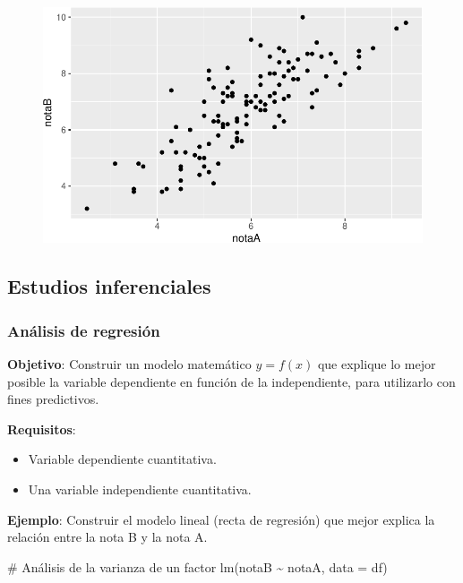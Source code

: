 \documentclass[
  a4paper,
]{scrreport}
\newenvironment{Shaded}{\begin{snugshade}}{\end{snugshade}}
\newcommand{\AttributeTok}[1]{\textcolor[rgb]{0.40,0.45,0.13}{#1}}
\newcommand{\CommentTok}[1]{\textcolor[rgb]{0.37,0.37,0.37}{#1}}
\newcommand{\FunctionTok}[1]{\textcolor[rgb]{0.28,0.35,0.67}{#1}}
\newcommand{\NormalTok}[1]{\textcolor[rgb]{0.00,0.23,0.31}{#1}}
\newcommand{\SpecialCharTok}[1]{\textcolor[rgb]{0.37,0.37,0.37}{#1}}
\providecommand{\tightlist}{%
  \setlength{\itemsep}{0pt}\setlength{\parskip}{0pt}}\usepackage{longtable,booktabs,array}
\theoremstyle{definition}
\theoremstyle{definition}
\theoremstyle{remark}
\begin{document}
\begin{figure}[H]

{\centering \includegraphics{./08-analisis-estadisticos_files/figure-pdf/unnamed-chunk-59-1.pdf}

}

\end{figure}

\hypertarget{estudios-inferenciales-5}{%
\subsection{Estudios inferenciales}\label{estudios-inferenciales-5}}

\hypertarget{anuxe1lisis-de-regresiuxf3n}{%
\subsubsection{Análisis de
regresión}\label{anuxe1lisis-de-regresiuxf3n}}

\textbf{Objetivo}: Construir un modelo matemático \(y=f(x)\) que
explique lo mejor posible la variable dependiente en función de la
independiente, para utilizarlo con fines predictivos.

\textbf{Requisitos}:

\begin{itemize}
\tightlist
\item
  Variable dependiente cuantitativa.
\item
  Una variable independiente cuantitativa.
\end{itemize}

\textbf{Ejemplo}: Construir el modelo lineal (recta de regresión) que
mejor explica la relación entre la nota B y la nota A.

\begin{Shaded}
\begin{Highlighting}[]
\CommentTok{\# Análisis de la varianza de un factor}
\FunctionTok{lm}\NormalTok{(notaB }\SpecialCharTok{\textasciitilde{}}\NormalTok{ notaA, }\AttributeTok{data =}\NormalTok{ df)}
\end{Highlighting}
\end{Shaded}
\end{document}
